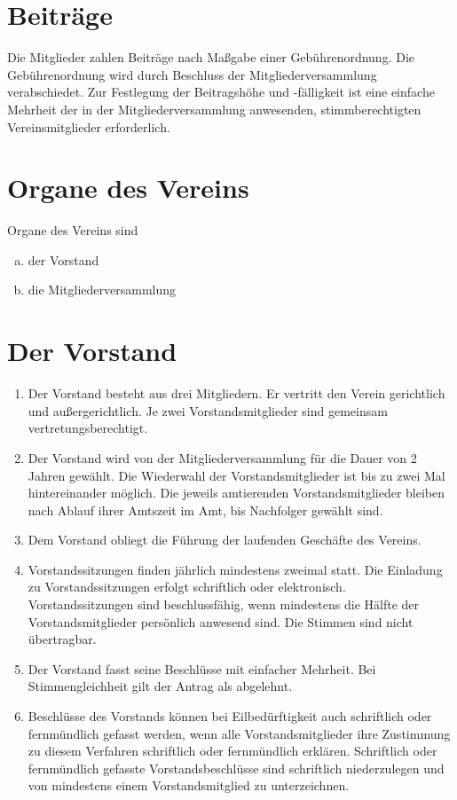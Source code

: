 \documentclass[a5paper, ngerman, 10pt]{scrreprt}
\begin{document}
\section{Beiträge}
Die Mitglieder zahlen Beiträge nach Maßgabe einer Gebührenordnung. Die
Gebührenordnung wird durch Beschluss der Mitgliederversammlung verabschiedet.
Zur Festlegung der Beitragshöhe und -fälligkeit ist eine einfache Mehrheit der
in der Mitgliederversammlung anwesenden, stimmberechtigten Vereinsmitglieder
erforderlich.


\section{Organe des Vereins}
Organe des Vereins sind
\begin{enumerate}[a.]
    \item der Vorstand
    \item die Mitgliederversammlung
\end{enumerate}


\section{Der Vorstand}
\begin{enumerate}[(1)]
    \item Der Vorstand besteht aus drei Mitgliedern. Er vertritt den Verein
        gerichtlich und außergerichtlich. Je zwei Vorstandsmitglieder sind
        gemeinsam vertretungsberechtigt.
    \item Der Vorstand wird von der Mitgliederversammlung für die Dauer von 2
        Jahren gewählt. Die Wiederwahl der Vorstandsmitglieder ist bis zu zwei
        Mal hintereinander möglich. Die jeweils amtierenden Vorstandsmitglieder
        bleiben nach Ablauf ihrer Amtszeit im Amt, bis Nachfolger gewählt sind.
    \item Dem Vorstand obliegt die Führung der laufenden Geschäfte des Vereins.
    \item Vorstandssitzungen finden jährlich mindestens zweimal statt. Die
        Einladung zu Vorstandssitzungen erfolgt schriftlich oder elektronisch.
        Vorstandssitzungen sind beschlussfähig, wenn mindestens die Hälfte der
        Vorstandsmitglieder persönlich anwesend sind. Die Stimmen sind nicht
        übertragbar.
    \item Der Vorstand fasst seine Beschlüsse mit einfacher Mehrheit. Bei
        Stimmengleichheit gilt der Antrag als abgelehnt.
    \item Beschlüsse des Vorstands können bei Eilbedürftigkeit auch schriftlich
        oder fernmündlich gefasst werden, wenn alle Vorstandsmitglieder ihre
        Zustimmung zu diesem Verfahren schriftlich oder fernmündlich erklären.
        Schriftlich oder fernmündlich gefasste Vorstandsbeschlüsse sind
        schriftlich niederzulegen und von mindestens einem Vorstandsmitglied zu
        unterzeichnen.
\end{enumerate}
\end{document}
